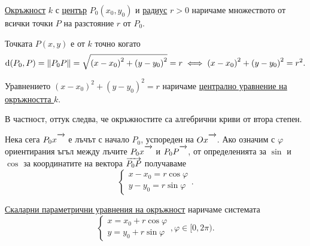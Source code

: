 \documentclass[numbers=endperiod, DIV=15]{scrartcl}
\begin{document}
\begin{definition}
  \underline{Окръжност} $k$ с \underline{център} $P_0(x_0, y_0)$ и \underline{радиус} $r > 0$ наричаме множеството от всички точки $P$ на разстояние $r$ от $P_0$.

  Точката $P(x, y)$ е от $k$ точно когато
  \begin{displaymath}
    \operatorname{d}(P_0, P)
    =
    \left\Vert P_0 P \right\Vert
    =
    \sqrt{{(x - x_0)}^2 + {(y - y_0)}^2} = r
    \iff
    {(x - x_0)}^2 + {(y - y_0)}^2 = r^2.
  \end{displaymath}

  Уравнението ${(x - x_0)}^2 + {(y - y_0)}^2 = r$ наричаме \underline{централно уравнение на окръжността $k$}.

  В частност, оттук следва, че окръжностите са алгебрични криви от втора степен.

  \bigskip
  \begin{minipage}{0.5\textwidth}
    Нека сега $P_0 x\Ray$ е лъчът с начало $P_0$, успореден на $Ox\Ray$. Ако означим с $\varphi$ ориентирания ъгъл между лъчите $P_0x\Ray$ и $P_0 P\Ray$, от определенията за $\sin$ и $\cos$ за координатите на вектора $\overrightarrow{P_0 P}$ получаваме
    \begin{displaymath}
      \begin{cases}
        x - x_0 = r \cos \varphi \\
        y - y_0 = r \sin \varphi
      \end{cases}.
    \end{displaymath}

    \underline{Скаларни параметрични уравнения на окръжност} наричаме системата
    \begin{displaymath}
      \begin{cases}
        x = x_0 + r \cos \varphi \\
        y = y_0 + r \sin \varphi
      \end{cases},
      \varphi \in [0, 2\pi).
    \end{displaymath}
  \end{minipage}
  \begin{minipage}{0.5\textwidth}
    \begin{figure}[H]
      \begin{center}
\end{center}
\end{figure}
\end{minipage}
\end{definition}
\end{document}
